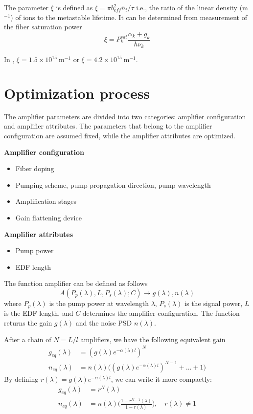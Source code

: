 \documentclass[a4paper]{article}
\begin{document}
The parameter $\xi$ is defined as $\xi = \pi b_{eff}^2\bar{n}_t/\tau$ i.e., the ratio of the linear density (m$^{-1}$) of ions to the metastable lifetime. It can be determined from measurement of the fiber saturation power 
\begin{equation}
	\xi = P^{sat}_k\frac{\alpha_k+g_k}{h\nu_k}
\end{equation}

In \cite{Giles1991}, $\xi = 1.5\times10^{15}~\mathrm{m}^{-1}$ or  $\xi = 4.2\times10^{15}~\mathrm{m}^{-1}$.

\section{Optimization process}

The amplifier parameters are divided into two categories: amplifier configuration and amplifier attributes. The parameters that belong to the amplifier configuration are assumed fixed, while the amplifier attributes are optimized.

\noindent\textbf{Amplifier configuration}
\begin{itemize}
	\item Fiber doping
	\item Pumping scheme, pump propagation direction, pump wavelength
	\item Amplification stages
	\item Gain flattening device
\end{itemize}


\noindent\textbf{Amplifier attributes}
\begin{itemize}
	\item Pump power
	\item EDF length
\end{itemize}

The function amplifier can be defined as follows
\begin{equation}
	A(P_p(\lambda), L, P_s(\lambda); C) \to g(\lambda), n(\lambda)
\end{equation}
where $P_p(\lambda)$ is the pump power at wavelength $\lambda$,  $P_s(\lambda)$ is the signal power, $L$ is the EDF length, and $C$ determines the amplifier configuration. The function returns the gain $g(\lambda)$ and the noise PSD $n(\lambda)$.

After a chain of $N = L/l$ amplifiers, we have the following equivalent gain
\begin{align}
	g_{eq}(\lambda) &= (g(\lambda)e^{-\alpha(\lambda)l})^N \\
	n_{eq}(\lambda) &= n(\lambda)\Big((g(\lambda)e^{-\alpha(\lambda)l})^{N-1}+\ldots+1\Big)
\end{align}
By defining $r(\lambda) = g(\lambda)e^{-\alpha(\lambda)l}$, we can write it more compactly:
\begin{align}
g_{eq}(\lambda) &= r^N(\lambda) \\
n_{eq}(\lambda) &= n(\lambda)\Big(\frac{1-r^{N-1}(\lambda)}{1-r(\lambda)}\Big), \quad r(\lambda)\neq 1
\end{align}
\end{document}
